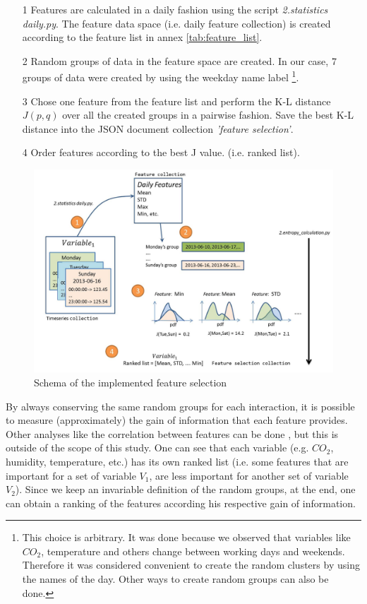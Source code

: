 \begin{itemize}
\item[1] Features are calculated in a daily fashion using the script \textit{2.statistics daily.py}. The feature data space (i.e. daily feature collection) is created according to the feature list in annex \ref{tab:feature_list}.
\item[2] Random groups of data in the feature space are created. In our case, 7 groups of data were created by using the weekday name label \footnote{This choice is arbitrary. It was done because we observed that variables like $CO_2$, temperature and others change between working days and weekends. Therefore it was considered convenient to create the random clusters by using the names of the day. Other ways to create random groups can also be done.}.
\item[3] Chose one feature from the feature list and perform the K-L distance $J(p,q)$ over all the created groups in a pairwise fashion. Save the best K-L distance into the JSON document collection \textit{'feature selection'}.
\item[4] Order features according to the best J value. (i.e. ranked list).   
\end{itemize}

\begin{figure}[h!]
  \vspace{0.5em} %
  \includegraphics[scale=0.5]{Figures/feature_selection.jpg}
  \caption{Schema of the implemented feature selection}
  \label{fig:schema}
\end{figure}


By always conserving the same random groups for each interaction, it is possible to measure (approximately) the gain of information that each feature provides. Other analyses like the correlation between features can be done \cite{sui2013information}, but this is outside of the scope of this study. One can see that each variable (e.g. $CO_2$, humidity, temperature, etc.) has its own ranked list (i.e. some features that are important for a set of variable $V_1$, are less important for another set of variable $V_2$). Since we keep an invariable definition of the random groups, at the end, one can obtain a ranking of the features according his respective gain of information.


